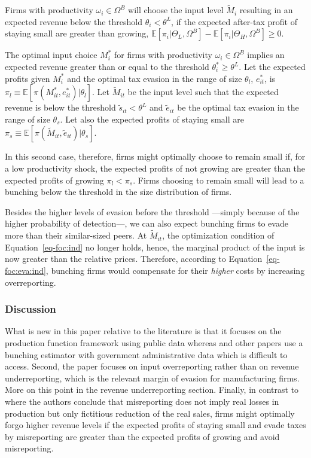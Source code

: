 \documentclass[
  12pt]{article}
\theoremstyle{definition}
\theoremstyle{remark}
\begin{document}
Firms with productivity \(\omega_{i}\in \Omega^B\) will choose the input
level \(\tilde{M}_{i}\) resulting in an expected revenue below the
threshold \(\theta_{i}<\theta^L\), if the expected after-tax profit of
staying small are greater than growing,
\(\mathbb{E}[\pi_{i}|\Theta_L, \Omega^B]-\mathbb{E}[\pi_{i}|\Theta_H, \Omega^B]\ge0\).

The optimal input choice \(M^*_{i}\) for firms with productivity
\(\omega_i\in\Omega^B\) implies an expected revenue greater than or
equal to the threshold \(\theta^*_{i}\ge \theta^L\). Let the expected
profits given \(M^*_{i}\) and the optimal tax evasion in the range of
size \(\theta_l\), \(e^*_{it}\), is
\(\pi_l\equiv\mathbb{E}[\pi(M^*_{it}, e^*_{it})|\theta_l]\). Let
\(\tilde{M}_{it}\) be the input level such that the expected revenue is
below the threshold \(\tilde{s}_{it}<\theta^L\) and \(\tilde{e}_{it}\)
be the optimal tax evasion in the range of size \(\theta_s\). Let also
the expected profits of staying small are
\(\pi_s\equiv\mathbb{E}[\pi(\tilde{M}_{it},\tilde{e}_{it})|\theta_s]\).

In this second case, therefore, firms might optimally choose to remain
small if, for a low productivity shock, the expected profits of not
growing are greater than the expected profits of growing
\(\pi_l<\pi_s\). Firms choosing to remain small will lead to a bunching
below the threshold in the size distribution of firms.

Besides the higher levels of evasion before the threshold ---simply
because of the higher probability of detection---, we can also expect
bunching firms to evade more than their similar-sized peers. At
\(\tilde{M}_{it}\), the optimization condition of
Equation~\ref{eq-foc:ind} no longer holds, hence, the marginal product
of the input is now greater than the relative prices. Therefore,
according to Equation~\ref{eq-foc:eva:ind}, bunching firms would
compensate for their \emph{higher} costs by increasing overreporting.

\subsubsection{Discussion}\label{discussion}

What is new in this paper relative to the literature is that it focuses
on the production function framework using public data whereas
\citet{Almunia2018} and other papers use a bunching estimator with
government administrative data which is difficult to access. Second, the
paper focuses on input overreporting rather than on revenue
underreporting, which is the relevant margin of evasion for
manufacturing firms. More on this point in the revenue underreporting
section. Finally, in contrast to \citet{Almunia2018} where the authors
conclude that misreporting does not imply real losses in production but
only fictitious reduction of the real sales, firms might optimally forgo
higher revenue levels if the expected profits of staying small and evade
taxes by misreporting are greater than the expected profits of growing
and avoid misreporting.
\end{document}
